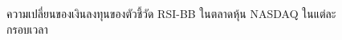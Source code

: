 \begin{figure}[!htb]
    \centering
    \caption{ความเปลี่ยนของเงินลงทุนของตัวชี้วัด RSI-BB ในตลาดหุ้น NASDAQ ในแต่ละกรอบเวลา}
    \label{fig:rsi-bb-stock-all}
\end{figure}

